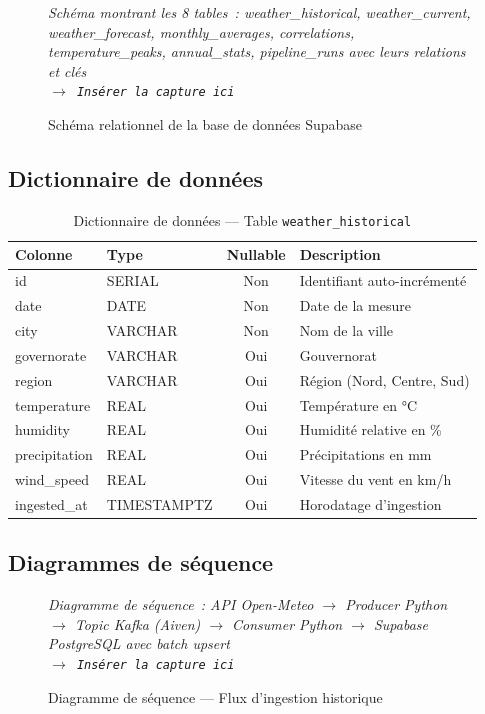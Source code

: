 \documentclass[a4paper,12pt,oneside]{report}
\newcommand{\imgplaceholder}[2]{%
  \begin{tcolorbox}[colback=blue!5,colframe=blue!40,title=#1]
    \centering\itshape #2\\[6pt]
    \texttt{$\rightarrow$ Insérer la capture ici}
  \end{tcolorbox}
}
\begin{document}
\begin{figure}[H]
\centering
\imgplaceholder{Figure~\ref{fig:schema_db} — Schéma relationnel Supabase}{Schéma montrant les 8 tables~: weather\_historical, weather\_current, weather\_forecast, monthly\_averages, correlations, temperature\_peaks, annual\_stats, pipeline\_runs avec leurs relations et clés}
\caption{Schéma relationnel de la base de données Supabase}
\label{fig:schema_db}
\end{figure}

\subsection{Dictionnaire de données}

\begin{table}[H]
\centering
\caption{Dictionnaire de données — Table \texttt{weather\_historical}}
\label{tab:dict_data}
\begin{tabularx}{\textwidth}{llcX}
\toprule
\textbf{Colonne} & \textbf{Type} & \textbf{Nullable} & \textbf{Description} \\
\midrule
id            & SERIAL     & Non & Identifiant auto-incrémenté \\
date          & DATE       & Non & Date de la mesure \\
city          & VARCHAR    & Non & Nom de la ville \\
governorate   & VARCHAR    & Oui & Gouvernorat \\
region        & VARCHAR    & Oui & Région (Nord, Centre, Sud) \\
temperature   & REAL       & Oui & Température en °C \\
humidity      & REAL       & Oui & Humidité relative en \% \\
precipitation & REAL       & Oui & Précipitations en mm \\
wind\_speed   & REAL       & Oui & Vitesse du vent en km/h \\
ingested\_at  & TIMESTAMPTZ & Oui & Horodatage d'ingestion \\
\bottomrule
\end{tabularx}
\end{table}

\subsection{Diagrammes de séquence}

\begin{figure}[H]
\centering
\imgplaceholder{Figure~\ref{fig:seq_ingestion} — Séquence d'ingestion}{Diagramme de séquence~: API Open-Meteo $\rightarrow$ Producer Python $\rightarrow$ Topic Kafka (Aiven) $\rightarrow$ Consumer Python $\rightarrow$ Supabase PostgreSQL avec batch upsert}
\caption{Diagramme de séquence — Flux d'ingestion historique}
\label{fig:seq_ingestion}
\end{figure}
\end{document}
